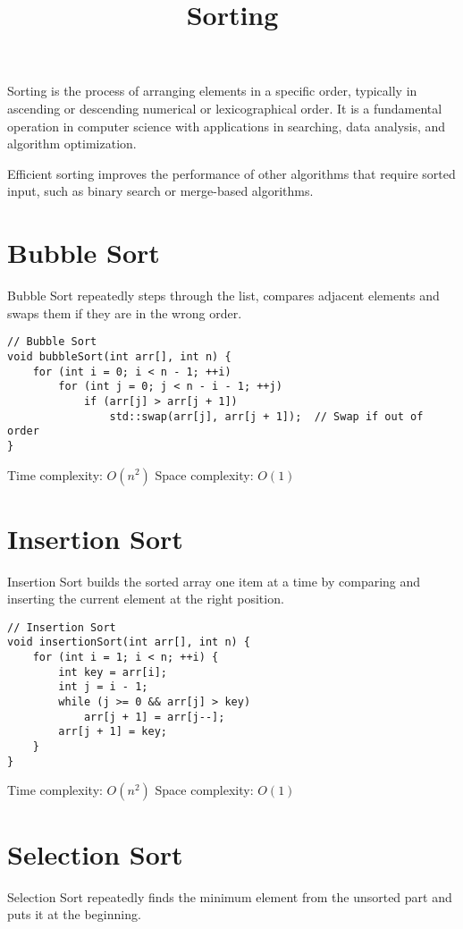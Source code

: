 \documentclass{article}
\title{Sorting}
\author{}
\date{}
\begin{document}
\maketitle



Sorting is the process of arranging elements in a specific order, typically in ascending or descending numerical or lexicographical order. It is a fundamental operation in computer science with applications in searching, data analysis, and algorithm optimization.

Efficient sorting improves the performance of other algorithms that require sorted input, such as binary search or merge-based algorithms. 

\section{Bubble Sort}
Bubble Sort repeatedly steps through the list, compares adjacent elements and swaps them if they are in the wrong order.

\begin{lstlisting}[style=cppstyle]
// Bubble Sort
void bubbleSort(int arr[], int n) {
    for (int i = 0; i < n - 1; ++i)
        for (int j = 0; j < n - i - 1; ++j)
            if (arr[j] > arr[j + 1])
                std::swap(arr[j], arr[j + 1]);  // Swap if out of order
}
\end{lstlisting}

Time complexity: $O(n^2)$
Space complexity: $O(1)$

\section{Insertion Sort}
Insertion Sort builds the sorted array one item at a time by comparing and inserting the current element at the right position.

\begin{lstlisting}[style=cppstyle]
// Insertion Sort
void insertionSort(int arr[], int n) {
    for (int i = 1; i < n; ++i) {
        int key = arr[i];
        int j = i - 1;
        while (j >= 0 && arr[j] > key)
            arr[j + 1] = arr[j--];
        arr[j + 1] = key;
    }
}
\end{lstlisting}

Time complexity: $O(n^2)$
Space complexity: $O(1)$

\section{Selection Sort}
Selection Sort repeatedly finds the minimum element from the unsorted part and puts it at the beginning.
\end{document}

